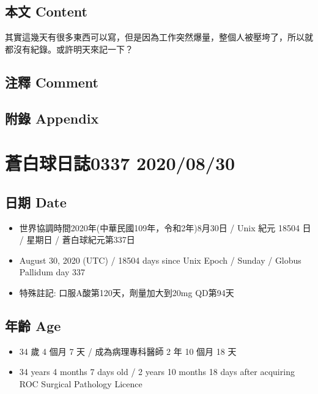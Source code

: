 \documentclass[a5paper, 11pt
]{book}
\providecommand{\tightlist}{%
  \setlength{\itemsep}{0pt}\setlength{\parskip}{0pt}}
\begin{document}
\hypertarget{ux672cux6587-content-74}{%
\subsection{本文 Content}\label{ux672cux6587-content-74}}

其實這幾天有很多東西可以寫，但是因為工作突然爆量，整個人被壓垮了，所以就都沒有紀錄。或許明天來記一下？

\hypertarget{ux6ce8ux91cb-comment-74}{%
\subsection{注釋 Comment}\label{ux6ce8ux91cb-comment-74}}

\hypertarget{ux9644ux9304-appendix-74}{%
\subsection{附錄 Appendix}\label{ux9644ux9304-appendix-74}}

\hypertarget{ux84bcux767dux7403ux65e5ux8a8c0337-20200830}{%
\section{蒼白球日誌0337
2020/08/30}\label{ux84bcux767dux7403ux65e5ux8a8c0337-20200830}}

\hypertarget{ux65e5ux671f-date-75}{%
\subsection{日期 Date}\label{ux65e5ux671f-date-75}}

\begin{itemize}
\tightlist
\item
  世界協調時間2020年(中華民國109年，令和2年)8月30日 / Unix 紀元 18504 日
  / 星期日 / 蒼白球紀元第337日
\item
  August 30, 2020 (UTC) / 18504 days since Unix Epoch / Sunday / Globus
  Pallidum day 337
\item
  特殊註記: 口服A酸第120天，劑量加大到20mg QD第94天
\end{itemize}

\hypertarget{ux5e74ux9f61-age-75}{%
\subsection{年齡 Age}\label{ux5e74ux9f61-age-75}}

\begin{itemize}
\tightlist
\item
  34 歲 4 個月 7 天 / 成為病理專科醫師 2 年 10 個月 18 天
\item
  34 years 4 months 7 days old / 2 years 10 months 18 days after
  acquiring ROC Surgical Pathology Licence
\end{itemize}
\end{document}
